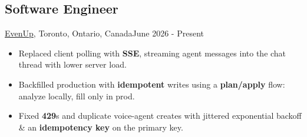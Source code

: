 \subsection{Software Engineer}{\href{https://www.evenuplaw.com/}{EvenUp}, Toronto, Ontario, Canada}{June 2026 - Present}
\begin{itemize}
    \item Replaced client polling with \textbf{SSE}, streaming agent messages into the chat thread with lower server load.
    \item Backfilled production with \textbf{idempotent} writes using a \textbf{plan/apply} flow: analyze locally, fill only in prod.
    \item Fixed \textbf{429}s and duplicate voice-agent creates with jittered exponential backoff \& an \textbf{idempotency key} on the primary key.
\end{itemize}
